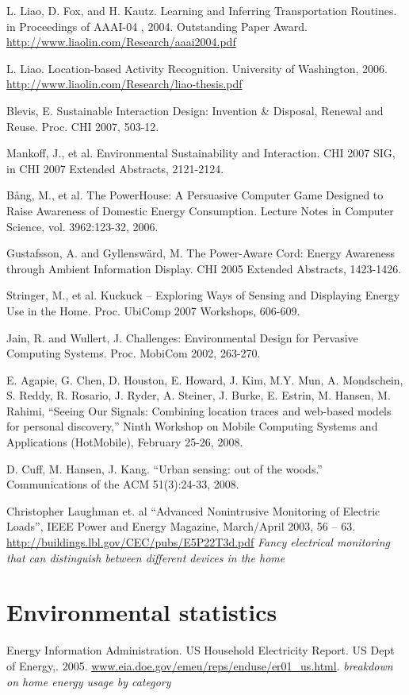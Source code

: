 L. Liao, D. Fox, and H. Kautz. Learning and Inferring Transportation Routines. in Proceedings of AAAI-04 , 2004. Outstanding Paper Award. \url{http://www.liaolin.com/Research/aaai2004.pdf}

L. Liao. Location-based Activity Recognition. University of Washington, 2006. \url{http://www.liaolin.com/Research/liao-thesis.pdf}

Blevis, E.  Sustainable Interaction Design: Invention \& Disposal, Renewal and Reuse.  Proc. CHI 2007, 503-12.

Mankoff, J., et al.  Environmental Sustainability and Interaction.  CHI 2007 SIG, in CHI 2007 Extended Abstracts, 2121-2124.

Bång, M., et al. The PowerHouse: A Persuasive Computer Game Designed to Raise Awareness of Domestic Energy Consumption.  Lecture Notes in Computer Science, vol. 3962:123-32, 2006.

Gustafsson, A. and Gyllenswärd, M. The Power-Aware Cord: Energy Awareness through Ambient Information Display. CHI 2005 Extended Abstracts, 1423-1426.

Stringer, M., et al.  Kuckuck – Exploring Ways of Sensing and Displaying Energy Use in the Home.  Proc. UbiComp 2007 Workshops, 606-609.

Jain, R. and Wullert, J. Challenges: Environmental Design for Pervasive Computing Systems.  Proc. MobiCom 2002, 263-270.

E. Agapie, G. Chen, D. Houston, E. Howard, J. Kim, M.Y. Mun, A. Mondschein, S. Reddy, R. Rosario, J. Ryder, A. Steiner, J. Burke, E. Estrin, M. Hansen, M. Rahimi, “Seeing Our Signals: Combining location traces and web-based models for personal discovery,” Ninth Workshop on Mobile Computing Systems and Applications (HotMobile), February 25-26, 2008.

D. Cuff, M. Hansen, J. Kang. “Urban sensing: out of the woods.” Communications of the ACM 51(3):24-33, 2008.

Christopher Laughman et. al ``Advanced Nonintrusive Monitoring of Electric Loads'', IEEE Power and Energy Magazine, March/April 2003, 56 – 63. \url{http://buildings.lbl.gov/CEC/pubs/E5P22T3d.pdf} \emph{Fancy electrical monitoring that can distinguish between different devices in the home}


\section{Environmental statistics}
Energy Information Administration. US Household Electricity Report. US Dept of Energy,. 2005. \url{www.eia.doe.gov/emeu/reps/enduse/er01_us.html}. \emph{breakdown on home energy usage by category}

